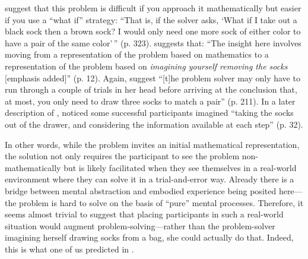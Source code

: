 \documentclass[twocolumn, serif, empirical, authordate]{jote-article}
\begin{document}
\textcite{Bowden2005} suggest that this problem is difficult if you approach it mathematically but easier if you use a ``what if'' strategy: ``That is, if the solver asks, `What if I take out a black sock then a brown sock? I would only need one more sock of either color to have a pair of the same color'\,'' (p. 323). \textcite{Jones2003} suggests that: ``The insight here involves moving from a representation of the problem based on mathematics to a representation of the problem based on \emph{imagining yourself removing the socks} {[}emphasis added{]}'' (p.
12). Again, \textcite{Chu2011} suggest ``{[}t{]}he problem solver may only have to run through a couple of trials in her head before arriving at the conclusion that, at most, you only need to draw three socks to match a pair'' (p. 211). In a later description of \textcite{Fleck2013}, \textcite{Weisberg2015} noticed some successful participants imagined ``taking the socks out of the drawer, and considering the information available at each step'' (p. 32).

In other words, while the problem invites an initial mathematical representation, the solution not only requires the participant to see the problem non-mathematically but is likely facilitated when they see themselves in a real-world environment where they can solve it in a trial-and-error way. Already there is a bridge between mental abstraction and embodied experience being posited here---the problem is hard to solve on the basis of ``pure'' mental processes. Therefore, it seems almost trivial to suggest that placing participants in such a real-world situation would augment problem-solving---rather than the problem-solver imagining herself drawing socks from a bag, she could actually do that. Indeed, this is what one of us predicted in \textcite{Vallée-Tourangeau2020}.
\end{document}

